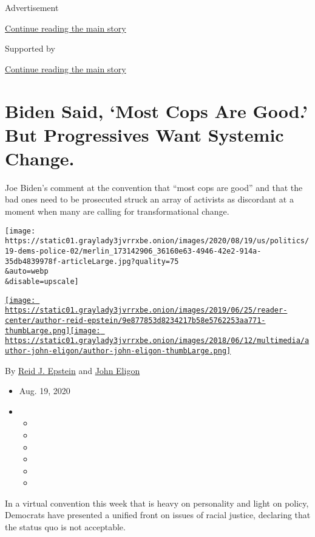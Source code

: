 Advertisement

\protect\hyperlink{after-top}{Continue reading the main story}

Supported by

\protect\hyperlink{after-sponsor}{Continue reading the main story}

\hypertarget{biden-said-most-cops-are-good-but-progressives-want-systemic-change}{%
\section{Biden Said, `Most Cops Are Good.' But Progressives Want
Systemic
Change.}\label{biden-said-most-cops-are-good-but-progressives-want-systemic-change}}

Joe Biden's comment at the convention that ``most cops are good'' and
that the bad ones need to be prosecuted struck an array of activists as
discordant at a moment when many are calling for transformational
change.

\texttt{[image: https://static01.graylady3jvrrxbe.onion/images/2020/08/19/us/politics/19-dems-police-02/merlin\_173142906\_36160e63-4946-42e2-914a-35db4839978f-articleLarge.jpg?quality=75\\\&auto=webp\\\&disable=upscale]}

\href{https://www.nytimes3xbfgragh.onion/by/reid-j-epstein}{\texttt{[image: https://static01.graylady3jvrrxbe.onion/images/2019/06/25/reader-center/author-reid-epstein/9e877853d8234217b58e5762253aa771-thumbLarge.png]}}\href{https://www.nytimes3xbfgragh.onion/by/john-eligon}{\texttt{[image: https://static01.graylady3jvrrxbe.onion/images/2018/06/12/multimedia/author-john-eligon/author-john-eligon-thumbLarge.png]}}

By \href{https://www.nytimes3xbfgragh.onion/by/reid-j-epstein}{Reid J.
Epstein} and
\href{https://www.nytimes3xbfgragh.onion/by/john-eligon}{John Eligon}

\begin{itemize}
\item
  Aug. 19, 2020
\item
  \begin{itemize}
  \item
  \item
  \item
  \item
  \item
  \item
  \end{itemize}
\end{itemize}

In a virtual convention this week that is heavy on personality and light
on policy, Democrats have presented a unified front on issues of racial
justice, declaring that the status quo is not acceptable.

